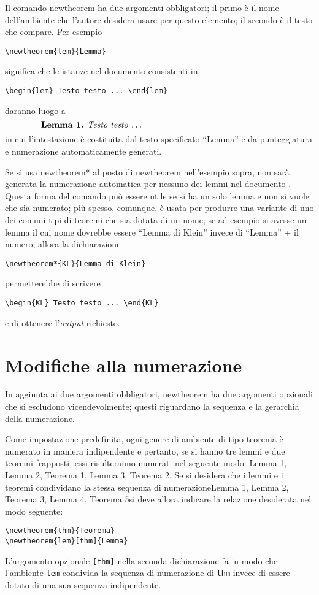 \documentclass[a4paper]{article}
\providecommand{\qq}[1]{\textquotedblleft#1\textquotedblright}
\providecommand{\mdash}{\textemdash\penalty\hyphenpenalty}
\newcommand{\ntt}{%
  \fontfamily\ttdefault \fontseries\mddefault \fontshape\updefault
  \selectfont
}
\DeclareRobustCommand{\cn}[1]{{\ntt\bslchar#1}}
\begin{document}
Il comando \cn{newtheorem} ha due argomenti obbligatori; il primo \`e il
nome dell'ambiente che l'autore desidera usare per questo elemento; il
secondo \`e il testo che compare. Per esempio
\begin{verbatim}
\newtheorem{lem}{Lemma}
\end{verbatim}
significa che le istanze nel documento consistenti in
\begin{verbatim}
\begin{lem} Testo testo ... \end{lem}
\end{verbatim}
daranno luogo a
\[\makebox[.8\columnwidth]{%
  \textbf{Lemma 1.} \textit{Testo testo \dots}\hfill}\]
in cui l'intestazione \`e costituita dal testo specificato \qq{Lemma} e da
punteggiatura e numerazione automaticamente generati.

Se si usa \cn{newtheorem*} al posto di \cn{newtheorem} nell'esempio
sopra, non sar\`a generata la numerazione automatica per nessuno dei
lemmi nel documento . Questa forma del comando pu\`o essere utile se si
ha un solo lemma e non si vuole che sia numerato; pi\`u spesso,
comunque, \`e usata per produrre una variante di uno dei comuni tipi di
teoremi che sia dotata di un nome; se ad esempio si avesse un lemma il cui
nome dovrebbe essere \qq{Lemma di Klein} invece di \qq{Lemma} +
il numero, allora la dichiarazione
\begin{verbatim}
\newtheorem*{KL}{Lemma di Klein}
\end{verbatim}
permetterebbe di scrivere
\begin{verbatim}
\begin{KL} Testo testo ... \end{KL}
\end{verbatim}
e di ottenere l'\emph{output} richiesto.

\section{Modifiche alla numerazione}

In aggiunta ai due argomenti obbligatori, \cn{newtheorem} ha due
argomenti opzionali che si escludono vicendevolmente; questi riguardano
la sequenza e la gerarchia della numerazione.

Come impostazione predefinita, ogni genere di ambiente di tipo teorema
\`e numerato in maniera indipendente e pertanto, se si hanno tre lemmi e
due teoremi frapposti, essi risulteranno numerati nel seguente modo: Lemma 1, Lemma
2, Teorema 1, Lemma 3, Teorema 2. Se si desidera che i lemmi e i teoremi
condividano la stessa sequenza di numerazione\mdash Lemma 1, Lemma 2, Teorema 3, Lemma
4, Teorema 5\mdash si deve allora indicare la relazione desiderata nel
modo seguente:
\begin{verbatim}
\newtheorem{thm}{Teorema}
\newtheorem{lem}[thm]{Lemma}
\end{verbatim}
L'argomento opzionale \verb'[thm]' nella seconda dichiarazione fa in
modo che l'ambiente \texttt{lem} condivida la sequenza di numerazione di
\texttt{thm} invece di essere dotato di una sua sequenza indipendente.
\end{document}
